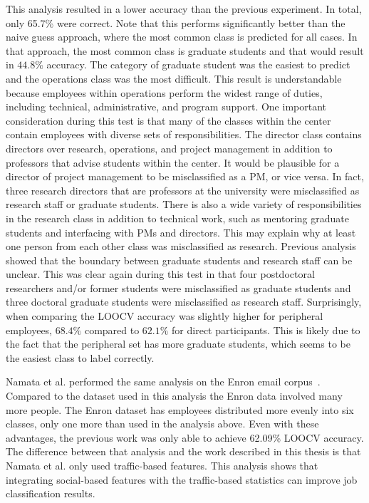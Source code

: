\documentclass[12pt]{report}
\begin{document}
This analysis resulted in a lower accuracy than the previous experiment.
In total, only 65.7\% were correct.
Note that this performs significantly better than the naive guess approach, where the most common class is predicted for all cases.
In that approach, the most common class is graduate students and that would result in $44.8\%$ accuracy.
The category of graduate student was the easiest to predict and the operations class was the most difficult.
This result is understandable because employees within operations perform the widest range of duties, including technical, administrative, and program support.
One important consideration during this test is that many of the classes within the center contain employees with diverse sets of responsibilities.
The director class contains directors over research, operations, and project management in addition to professors that advise students within the center.
It would be plausible for a director of project management to be misclassified as a PM, or vice versa.
In fact, three research directors that are professors at the university were misclassified as research staff or graduate students.
There is also a wide variety of responsibilities in the research class in addition to technical work, such as mentoring graduate students and interfacing with PMs and directors.
This may explain why at least one person from each other class was misclassified as research.
Previous analysis showed that the boundary between graduate students and research staff can be unclear.
This was clear again during this test in that four postdoctoral researchers and/or former students were misclassified as graduate students and three doctoral graduate students were misclassified as research staff.
Surprisingly, when comparing the LOOCV accuracy was slightly higher for peripheral employees, $68.4\%$ compared to $62.1\%$ for direct participants.
This is likely due to the fact that the peripheral set has more graduate students, which seems to be the easiest class to label correctly.

Namata et al. performed the same analysis on the Enron email corpus~\cite{namata_inferring_2006}.
Compared to the dataset used in this analysis the Enron data involved many more people.
The Enron dataset has employees distributed more evenly into six classes, only one more than used in the analysis above.
Even with these advantages, the previous work was only able to achieve 62.09\% LOOCV accuracy.
The difference between that analysis and the work described in this thesis is that Namata et al. only used traffic-based features.
This analysis shows that integrating social-based features with the traffic-based statistics can improve job classification results.
\end{document}
